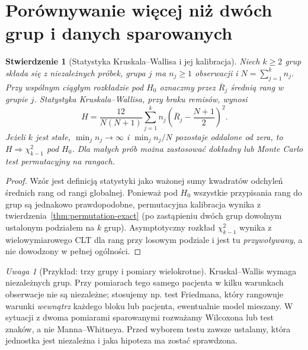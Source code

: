 \documentclass[11pt,a4paper,oneside]{report}
\numberwithin{equation}{chapter}
\theoremstyle{plain}
\newtheorem{stwierdzenie}[twierdzenie]{Stwierdzenie}
\theoremstyle{definition}
\theoremstyle{remark}
\newtheorem{uwaga}{Uwaga}[chapter]
\begin{document}
\section{Porównywanie więcej niż dwóch grup i danych sparowanych}
\begin{stwierdzenie}[Statystyka Kruskala--Wallisa i jej kalibracja]
\label{prop:kruskal-wallis}
Niech $k\ge2$ grup składa się z niezależnych próbek,
grupa $j$ ma $n_j\ge1$ obserwacji i
$N=\sum_{j=1}^kn_j$. Przy wspólnym \emph{ciągłym}
rozkładzie pod $H_0$ oznaczmy przez $\overline R_j$
średnią rang w grupie $j$.
Statystyka Kruskala--Wallisa, przy braku remisów, wynosi
\[
 H=\frac{12}{N(N+1)}
 \sum_{j=1}^kn_j
 \left(\overline R_j-\frac{N+1}{2}\right)^2.
\]
Jeżeli $k$ jest stałe, $\min_jn_j\to\infty$ i
$\min_j n_j/N$ pozostaje oddalone od zera,
to $H\Rightarrow\chi^2_{k-1}$ pod $H_0$.
Dla małych prób można zastosować dokładny lub
Monte Carlo test permutacyjny na rangach.
\end{stwierdzenie}
\begin{proof}
Wzór jest definicją statystyki jako ważonej sumy
kwadratów odchyleń średnich rang od rangi globalnej.
Ponieważ pod $H_0$ wszystkie przypisania rang do grup
są jednakowo prawdopodobne, permutacyjna kalibracja
wynika z twierdzenia~\ref{thm:permutation-exact}
(po zastąpieniu dwóch grup dowolnym ustalonym
podziałem na $k$ grup). Asymptotyczny rozkład
$\chi^2_{k-1}$ wynika z wielowymiarowego CLT dla
rang przy losowym podziale i jest tu \emph{przywoływany},
a nie dowodzony w pełnej ogólności.
\end{proof}

\begin{uwaga}[Przykład: trzy grupy i pomiary wielokrotne]
Kruskal--Wallis wymaga niezależnych grup.
Przy pomiarach tego samego pacjenta w kilku warunkach
obserwacje nie są niezależne; stosujemy np.
test Friedmana, który rangowuje warunki \emph{wewnątrz}
każdego bloku lub pacjenta, ewentualnie model mieszany.
W sytuacji z dwoma pomiarami sparowanymi
rozważamy Wilcoxona lub test znaków,
a nie Manna--Whitneya.
Przed wyborem testu zawsze ustalamy, która jednostka
jest niezależna i jaka hipoteza ma zostać sprawdzona.
\end{uwaga}
\end{document}

